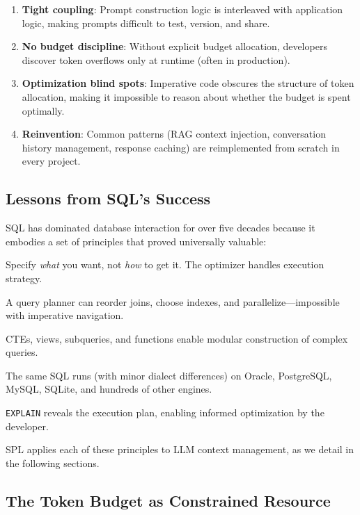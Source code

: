 \documentclass[11pt,a4paper]{article}
\begin{document}
\begin{enumerate}[nosep]
  \item \textbf{Tight coupling}: Prompt construction logic is interleaved with application logic, making prompts difficult to test, version, and share.
  \item \textbf{No budget discipline}: Without explicit budget allocation, developers discover token overflows only at runtime (often in production).
  \item \textbf{Optimization blind spots}: Imperative code obscures the structure of token allocation, making it impossible to reason about whether the budget is spent optimally.
  \item \textbf{Reinvention}: Common patterns (RAG context injection, conversation history management, response caching) are reimplemented from scratch in every project.
\end{enumerate}

\subsection{Lessons from SQL's Success}

SQL has dominated database interaction for over five decades because it embodies a set of principles that proved universally valuable:

\begin{description}[nosep]
  \item[Declarative] Specify \emph{what} you want, not \emph{how} to get it. The optimizer handles execution strategy.
  \item[Optimizable] A query planner can reorder joins, choose indexes, and parallelize---impossible with imperative navigation.
  \item[Composable] CTEs, views, subqueries, and functions enable modular construction of complex queries.
  \item[Portable] The same SQL runs (with minor dialect differences) on Oracle, PostgreSQL, MySQL, SQLite, and hundreds of other engines.
  \item[Transparent] \texttt{EXPLAIN} reveals the execution plan, enabling informed optimization by the developer.
\end{description}

SPL applies each of these principles to LLM context management, as we detail in the following sections.

\subsection{The Token Budget as Constrained Resource}
\end{document}
